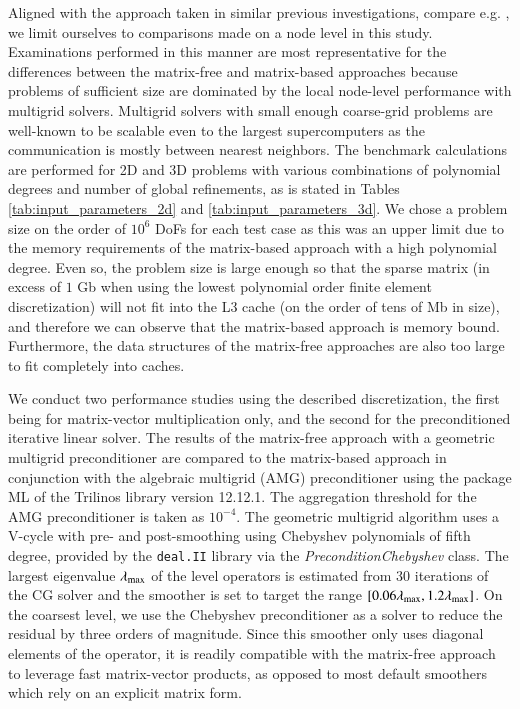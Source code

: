 \documentclass[AMA,STIX1COL]{WileyNJD-v2}
\begin{document}
Aligned with the approach taken in similar previous investigations, compare e.g. \cite{kronbichler2017fast},
we limit ourselves to comparisons made on a node level in this study.
Examinations performed in this manner are most representative for the differences between the matrix-free and matrix-based approaches because problems
of sufficient size are dominated by the local node-level performance with multigrid solvers.
Multigrid solvers with small enough coarse-grid problems are well-known to be scalable even to the largest supercomputers \cite{gholami2016,ibeid2018} as the communication is mostly between nearest neighbors.
The benchmark calculations are performed for 2D and 3D problems with various combinations of polynomial degrees and number of global refinements,
as is stated in Tables \ref{tab:input_parameters_2d} and \ref{tab:input_parameters_3d}.
We chose a problem size on the order of $10^6$ DoFs for each test case as this was an upper limit due to the memory requirements of the matrix-based approach with a high polynomial degree.
Even so, the problem size is large enough so that the sparse matrix (in excess of $1$ Gb when using the lowest polynomial order finite element discretization)
will not fit into the L3 cache (on the order of tens of Mb in size), and therefore we can observe that the matrix-based approach is memory bound.
Furthermore, the data structures of the matrix-free approaches are also too large to fit completely into caches.

We conduct two performance studies using the described discretization, the first being for matrix-vector multiplication only, and the second for the preconditioned iterative linear solver.
The results of the matrix-free approach with a geometric multigrid preconditioner are compared to the matrix-based approach in conjunction with the
algebraic multigrid (AMG) preconditioner using the package ML \cite{Gee2006a} of the Trilinos \cite{Heroux2005} library version 12.12.1.
The aggregation threshold for the AMG preconditioner is taken as $10^{-4}$.
The geometric multigrid algorithm uses a V-cycle with pre- and post-smoothing using Chebyshev polynomials \cite{Varga2009} of fifth degree, provided
by the \texttt{deal.II} library via the \textit{PreconditionChebyshev} class.
The largest eigenvalue $\lambda_{\rm{max}}$ of the level operators is estimated from $30$ iterations of the CG solver and the smoother
is set to target the range $[0.06\lambda_{\rm{max}}, 1.2\lambda_{\rm{max}}]$.
On the coarsest level, we use the Chebyshev preconditioner as a solver \cite{Varga2009} to reduce the residual by three orders of magnitude.
Since this smoother only uses diagonal elements of the operator, it is readily compatible with the matrix-free approach to leverage fast matrix-vector products,
as opposed to most default smoothers which rely on an explicit matrix form.
\end{document}
